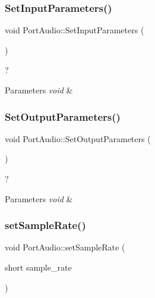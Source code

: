 \subsubsection{\texorpdfstring{Set\+Input\+Parameters()}{SetInputParameters()}}
{\footnotesize\ttfamily void Port\+Audio\+::\+Set\+Input\+Parameters (\begin{DoxyParamCaption}{ }\end{DoxyParamCaption})}



? 


\begin{DoxyParams}{Parameters}
{\em void} & \\
\hline
\end{DoxyParams}
\mbox{\label{class_port_audio_ab6c65dcf34b99509ef98eb6025f3f2c9}} 
\subsubsection{\texorpdfstring{Set\+Output\+Parameters()}{SetOutputParameters()}}
{\footnotesize\ttfamily void Port\+Audio\+::\+Set\+Output\+Parameters (\begin{DoxyParamCaption}{ }\end{DoxyParamCaption})}



? 


\begin{DoxyParams}{Parameters}
{\em void} & \\
\hline
\end{DoxyParams}
\mbox{\label{class_port_audio_a8d6e5890ce34df315cbb76b2399d1876}} 
\subsubsection{\texorpdfstring{set\+Sample\+Rate()}{setSampleRate()}}
{\footnotesize\ttfamily void Port\+Audio\+::set\+Sample\+Rate (\begin{DoxyParamCaption}\item[{short}]{sample\+\_\+rate }\end{DoxyParamCaption})}



